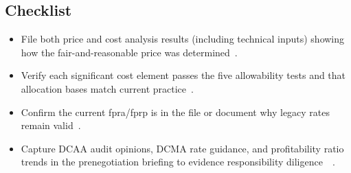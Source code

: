 \documentclass[../main.tex]{subfiles}
\begin{document}
\subsection{Checklist}
\begin{itemize}
	\item File both price and cost analysis results (including technical inputs) showing how the fair-and-reasonable price was determined~\autocite[\S~15.404-1]{FAR}.
	\item Verify each significant cost element passes the five allowability tests and that allocation bases match current practice~\autocite[\S\S~31.201-2, 31.203]{FAR}.
	\item Confirm the current \ac{fpra}/\ac{fprp} is in the file or document why legacy rates remain valid~\autocite[\S~15.407-3]{FAR}.
	\item Capture DCAA audit opinions, DCMA rate guidance, and profitability ratio trends in the prenegotiation briefing to evidence responsibility diligence~\autocite[\S\S~9.104-1, 42.101(b)]{FAR}~\autocite{edo-3-2-4-cost-price-evaluation-2024}.
\end{itemize}

\end{document}
